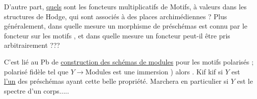 D’autre part, \uline{quels} sont les foncteurs multiplicatifs de Motifs,
à valeurs dans les structures de Hodge,
qui sont associés à des places archimédiennes ?
Plus généralement, dans quelle mesure un morphisme de préschémas
 est connu par le foncteur sur les motifs
, et dans quelle mesure un foncteur
 peut-il être pris arbitrairement ???

C’est lié au Pb de \uline{construction des schémas de modules} pour les motifs
polarisés ;  polarisé fidèle tel que
$Y\longrightarrow\mathrm{Modules}$ est une immersion
)
 alors  .
Kif kif si $Y$ est \uline{l’un} des préschémas ayant cette belle propriété.
Marchera en particulier si $Y$ est le spectre d’un corps.....

